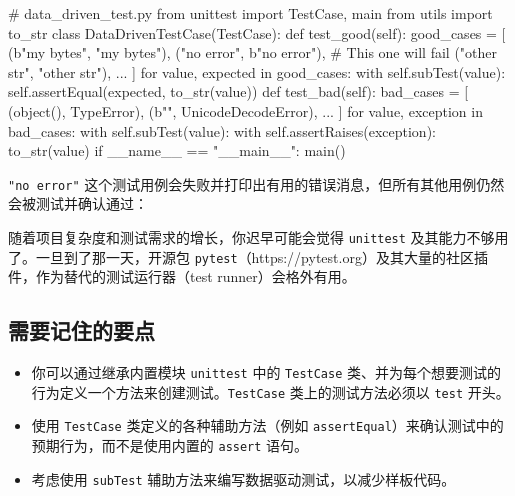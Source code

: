 \begin{codebox}[python]
# data_driven_test.py
from unittest import TestCase, main
from utils import to_str
class DataDrivenTestCase(TestCase):
    def test_good(self):
        good_cases = [
            (b"my bytes", "my bytes"),
            ("no error", b"no error"),  # This one will fail
            ("other str", "other str"),
            ...
        ]
        for value, expected in good_cases:
            with self.subTest(value):
                self.assertEqual(expected, to_str(value))
    def test_bad(self):
        bad_cases = [
            (object(), TypeError),
            (b"\xfa\xfa", UnicodeDecodeError),
            ...
        ]
        for value, exception in bad_cases:
            with self.subTest(value):
                with self.assertRaises(exception):
                    to_str(value)
if __name__ == "__main__":
    main()
\end{codebox}

\texttt{"no error"} 这个测试用例会失败并打印出有用的错误消息，但所有其他用例仍然会被测试并确认通过：


随着项目复杂度和测试需求的增长，你迟早可能会觉得 \texttt{unittest} 及其能力不够用了。一旦到了那一天，开源包 \texttt{pytest}（https://pytest.org）及其大量的社区插件，作为替代的测试运行器（test runner）会格外有用。

\subsection{需要记住的要点}

\begin{itemize}
\item 你可以通过继承内置模块 \texttt{unittest} 中的 \texttt{TestCase} 类、并为每个想要测试的行为定义一个方法来创建测试。\texttt{TestCase} 类上的测试方法必须以 \texttt{test} 开头。
\item 使用 \texttt{TestCase} 类定义的各种辅助方法（例如 \texttt{assertEqual}）来确认测试中的预期行为，而不是使用内置的 \texttt{assert} 语句。
\item 考虑使用 \texttt{subTest} 辅助方法来编写数据驱动测试，以减少样板代码。
\end{itemize}

